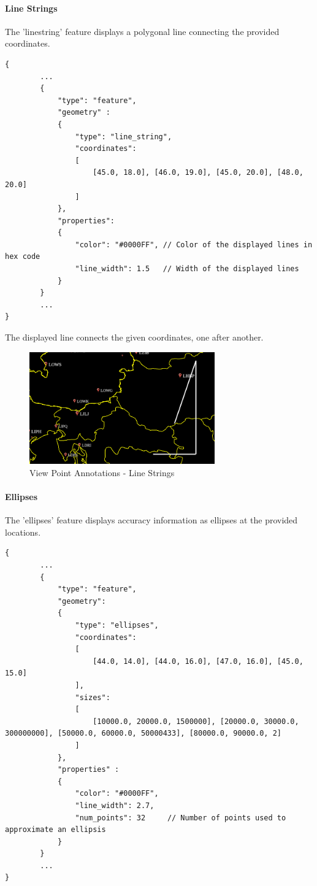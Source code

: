 \paragraph{Line Strings} The 'line\textunderscore string' feature displays a polygonal line connecting the provided coordinates.

\begin{lstlisting}[basicstyle=\small\ttfamily]
{
        ...
        {
            "type": "feature",
            "geometry" :
            {
                "type": "line_string",
                "coordinates": 
                [
                    [45.0, 18.0], [46.0, 19.0], [45.0, 20.0], [48.0, 20.0]
                ]
            },
            "properties":
            {
                "color": "#0000FF", // Color of the displayed lines in hex code
                "line_width": 1.5   // Width of the displayed lines
            }
        }
        ...
}
\end{lstlisting}

The displayed line connects the given coordinates, one after another.

\begin{figure}[H]
    \center
        \includegraphics[width=8cm]{figures/viewpoints_anno_example_linestring.png}
    \caption{View Point Annotations - Line Strings} 
\end{figure}

\paragraph{Ellipses} The 'ellipses' feature displays accuracy information as ellipses at the provided locations.

\begin{lstlisting}[basicstyle=\small\ttfamily]
{
        ...
        {
            "type": "feature",
            "geometry":
            {
                "type": "ellipses",
                "coordinates": 
                [
                    [44.0, 14.0], [44.0, 16.0], [47.0, 16.0], [45.0, 15.0]
                ],
                "sizes": 
                [
                    [10000.0, 20000.0, 1500000], [20000.0, 30000.0, 300000000], [50000.0, 60000.0, 50000433], [80000.0, 90000.0, 2]
                ]
            },
            "properties" :
            {
                "color": "#0000FF",
                "line_width": 2.7,
                "num_points": 32     // Number of points used to approximate an ellipsis
            }
        }
        ...
}
\end{lstlisting}

